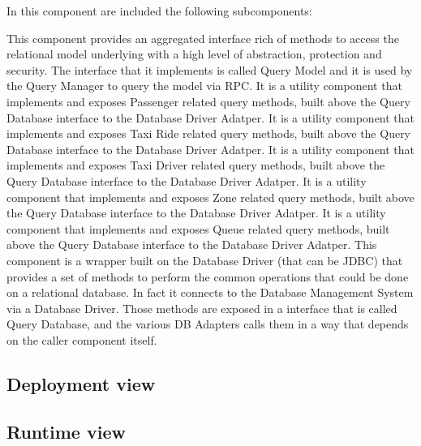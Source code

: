\begin{itemize}
	In this component are included the following subcomponents:
	\begin{itemize}
		This component provides an aggregated interface rich of methods to access the relational model underlying with a high level of abstraction, protection and security.
		The interface that it implements is called Query Model and it is used by the Query Manager to query the model via RPC.
		It is a utility component that implements and exposes Passenger related query methods, built above the Query Database interface to the Database Driver Adatper.
		It is a utility component that implements and exposes Taxi Ride related query methods, built above the Query Database interface to the Database Driver Adatper.
		It is a utility component that implements and exposes Taxi Driver related query methods, built above the Query Database interface to the Database Driver Adatper.
		It is a utility component that implements and exposes Zone related query methods, built above the Query Database interface to the Database Driver Adatper.
		It is a utility component that implements and exposes Queue related query methods, built above the Query Database interface to the Database Driver Adatper.
		This component is a wrapper built on the Database Driver (that can be JDBC) that provides a set of methods to perform the common operations that could be done on a relational database.
		In fact it connects to the Database Management System via a Database Driver.
		Those methods are exposed in a interface that is called Query Database, and the various DB Adapters calls them in a way that depends on the caller component itself.
	\end{itemize}
\end{itemize} 

\subsection{Deployment view}

\subsection{Runtime view}

